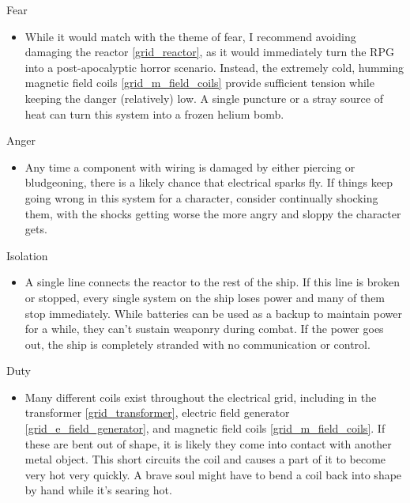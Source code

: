 \documentclass[a4paper]{article}
\begin{document}
\vspace{0.3cm}
\begin{minipage}[t]{0.4\linewidth}
Fear
\begin{itemize}
\item While it would match with the theme of fear, I recommend avoiding damaging the reactor \ref{grid_reactor}, as it would immediately turn the RPG into a post-apocalyptic horror scenario. Instead, the extremely cold, humming magnetic field coils \ref{grid_m_field_coils} provide sufficient tension while keeping the danger (relatively) low. A single puncture or a stray source of heat can turn this system into a frozen helium bomb. 
\end{itemize}
\end{minipage} 
\begin{minipage}[t]{0.4\linewidth}
Anger
\begin{itemize}
\item Any time a component with wiring is damaged by either piercing or bludgeoning, there is a likely chance that electrical sparks fly. If things keep going wrong in this system for a character, consider continually shocking them, with the shocks getting worse the more angry and sloppy the character gets.
\end{itemize}
\end{minipage}

\begin{minipage}[t]{0.4\linewidth}
Isolation
\begin{itemize}
\item A single line connects the reactor to the rest of the ship. If this line is broken or stopped, every single system on the ship loses power and many of them stop immediately. While batteries can be used as a backup to maintain power for a while, they can't sustain weaponry during combat. If the power goes out, the ship is completely stranded with no communication or control.
\end{itemize}
\end{minipage}
\begin{minipage}[t]{0.4\linewidth}
Duty
\begin{itemize}
\item Many different coils exist throughout the electrical grid, including in the transformer \ref{grid_transformer}, electric field generator \ref{grid_e_field_generator}, and magnetic field coils \ref{grid_m_field_coils}. If these are bent out of shape, it is likely they come into contact with another metal object. This short circuits the coil and causes a part of it to become very hot very quickly. A brave soul might have to bend a coil back into shape by hand while it's searing hot.
\end{itemize}
\end{minipage}
\end{document}
